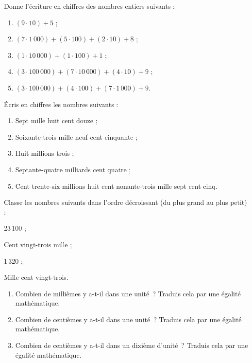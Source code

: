 \begin{exercice}
Donne l'écriture en chiffres des nombres entiers suivants :
\begin{enumerate}
 \item $(9 \cdot 10) + 5$ ;
 \item $(7 \cdot 1\,000) + (5 \cdot 100) + (2 \cdot 10) + 8$ ;
 \item $(1 \cdot 10\,000) + (1 \cdot 100) + 1$ ;
 \item  $(3 \cdot 100\,000) + (7 \cdot 10\,000) + (4 \cdot 10) + 9$ ;
 \item  $(3 \cdot 100\,000) + (4 \cdot 100) + (7 \cdot 1\,000) + 9$.
 \end{enumerate}
\end{exercice}


\begin{exercice}
Écris en chiffres les nombres suivants :
\begin{enumerate}
 \item Sept mille huit cent douze ;
 \item Soixante-trois mille neuf cent cinquante ;
 \item Huit millions trois ;
 \item Septante-quatre milliards cent quatre ;
 \item Cent trente-six millions huit cent nonante-trois mille sept cent cinq.
 \end{enumerate}
\end{exercice}

\begin{exercice}
Classe les nombres suivants dans l'ordre décroissant (du plus grand au plus petit) :
\begin{colitemize}{2}
 \item 23\,100 ;
 \item Cent vingt-trois mille ;
 \item 1\,320 ;
 \item Mille cent vingt-trois.
 \end{colitemize}
\end{exercice}



\begin{exercice}
\begin{enumerate}
 \item Combien de millièmes y a-t-il dans une unité ?
Traduis cela par une égalité mathématique.
 \item Combien de centièmes y a-t-il dans une unité ? Traduis cela par une égalité mathématique.
 \item Combien de centièmes y a-t-il dans un dixième d'unité ? Traduis cela par une égalité mathématique.
 \end{enumerate}
\end{exercice}


